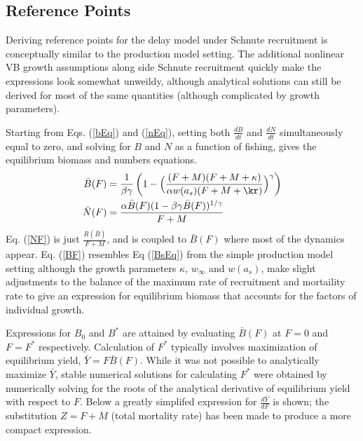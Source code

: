 %
\subsection{Reference Points}

%
Deriving reference points for the delay model under Schnute recruitment is 
conceptually similar to the production model setting. The additional nonlinear 
VB growth assumptions along side Schnute recruitment quickly make the 
expressions look somewhat unweildy, although analytical solutions can still be 
derived for most of the same quantities (although complicated by growth parameters).

%
Starting from Eqs. (\ref{bEq}) and (\ref{nEq}), setting both $\frac{dB}{dt}$ 
and $\frac{dN}{dt}$ simultaneously equal to zero, and solving for $B$ and $N$ 
as a function of fishing, gives the equilibrium biomass and numbers equations.
%
\begin{align}
\bar{B}(F) &= \frac{1}{\beta\gamma} \left( 1 - \Big(\frac{(F + M) (F + M + \kappa)}{\alpha w(a_s)(F + M + \kr)}\Big)^\gamma\right) \label{BF}\\
\bar{N}(F) &= \frac{\alpha\bar{B}(F)(1-\beta\gamma\bar{B}(F))^{1/\gamma}}{F+M} \label{NF}
\end{align}
%
Eq. (\ref{NF}) is just $\frac{R(\bar{B})}{F+M}$, and is coupled to $\bar{B}(F)$ 
where most of the dynamics appear. Eq. (\ref{BF}) resembles Eq (\ref{BsEq}) 
from the simple production model setting although the growth parameters 
$\kappa$, $w_\infty$ and $w(a_s)$, make slight adjustments to the balance of the 
maximum rate of recruitment and mortaility rate to give an expression for 
equilibrium biomass that accounts for the factors of individual growth.

%
Expressions for $B_0$ and $B^*$ are attained by evaluating $\bar{B}(F)$ at 
$F=0$ and $F=F^*$ respectively. Calculation of $F^*$ typically involves %
maximization of equilibrium yield, \mbox{$\bar{Y} = F\bar{B}(F)$.} While it was not 
possible to analytically maximize $\bar{Y}$, stable numerical solutions for 
calculating $F^*$ were obtained by numerically solving for the roots of the 
analytical derivative of equilibrium yield with respect to $F$. Below a greatly
simplifed expression for $\frac{d \bar{Y}}{dF}$ is shown; the substitution 
$Z=F+M$ (total mortality rate) has been made to produce a more compact expression.
 
